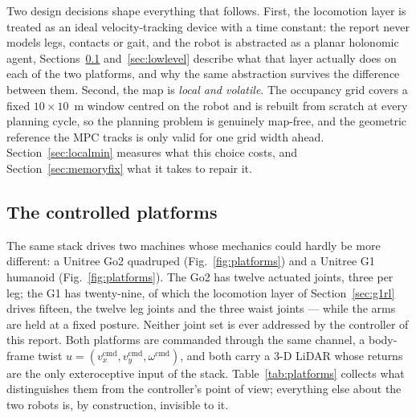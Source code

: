 \documentclass[11pt,a4paper]{article}
\newcommand{\astar}{$A^\star$}
\begin{document}

Two design decisions shape everything that follows. First, the locomotion layer is treated as an ideal
velocity-tracking device with a time constant: the report never models legs, contacts or gait, and the robot
is abstracted as a planar holonomic agent, Sections~\ref{sec:platforms} and~\ref{sec:lowlevel} describe
what that layer actually does on each of the two platforms, and why the same abstraction survives the
difference between them. Second, the map is \emph{local and volatile}. The
occupancy grid covers a fixed $10\times10$~m window centred on the robot and is rebuilt from scratch at every
planning cycle, so the planning problem is genuinely map-free, and the geometric reference the MPC tracks is
only valid for one grid width ahead. Section~\ref{sec:localmin} measures what this choice costs, and
Section~\ref{sec:memoryfix} what it takes to repair it.

\subsection{The controlled platforms}
\label{sec:platforms}

The same stack drives two machines whose mechanics could hardly be more different: a Unitree Go2 quadruped
(Fig.~\ref{fig:platforms}) and a Unitree G1 humanoid
(Fig.~\ref{fig:platforms}). The Go2 has
twelve actuated joints, three per leg; the G1 has twenty-nine, of which the locomotion layer of
Section~\ref{sec:g1rl} drives fifteen, the twelve leg joints and the three waist joints --- while the arms
are held at a fixed posture. Neither joint set is ever addressed by the controller of this report. Both
platforms are commanded through the same channel, a body-frame twist
$u=(v_x^{\mathrm{cmd}},v_y^{\mathrm{cmd}},\omega^{\mathrm{cmd}})$, and both carry a 3-D LiDAR whose returns
are the only exteroceptive input of the stack. Table~\ref{tab:platforms} collects what distinguishes them
from the controller's point of view; everything else about the two robots is, by construction, invisible to
it.
\end{document}
